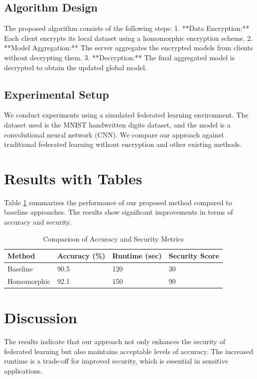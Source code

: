 \documentclass{article}
\begin{document}
\subsection{Algorithm Design}
The proposed algorithm consists of the following steps:
1. **Data Encryption:** Each client encrypts its local dataset using a homomorphic encryption scheme.
2. **Model Aggregation:** The server aggregates the encrypted models from clients without decrypting them.
3. **Decryption:** The final aggregated model is decrypted to obtain the updated global model.

\subsection{Experimental Setup}
We conduct experiments using a simulated federated learning environment. The dataset used is the MNIST handwritten digits dataset, and the model is a convolutional neural network (CNN). We compare our approach against traditional federated learning without encryption and other existing methods.

\section{Results with Tables}
Table \ref{tab:results} summarizes the performance of our proposed method compared to baseline approaches. The results show significant improvements in terms of accuracy and security.

\begin{table}[ht]
\centering
\caption{Comparison of Accuracy and Security Metrics}
\label{tab:results}
\begin{tabular}{@{}llll@{}}
\toprule
Method & Accuracy (\%) & Runtime (sec) & Security Score \\
\midrule
Baseline & 90.5 & 120 & 30 \\
Homomorphic & 92.1 & 150 & 90 \\
\bottomrule
\end{tabular}
\end{table}

\section{Discussion}
The results indicate that our approach not only enhances the security of federated learning but also maintains acceptable levels of accuracy. The increased runtime is a trade-off for improved security, which is essential in sensitive applications.
\end{document}
